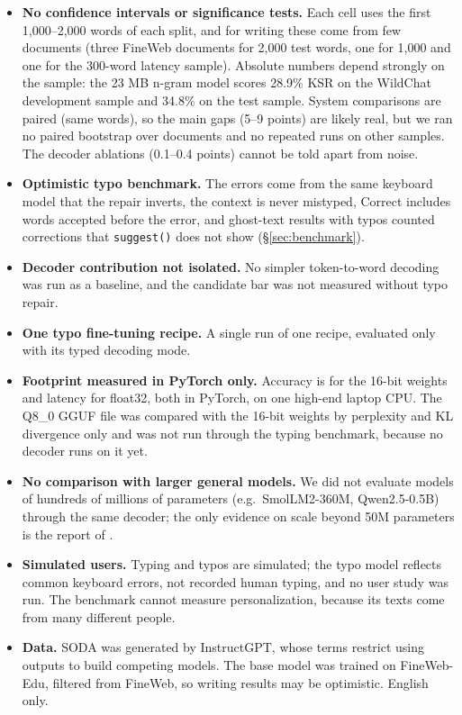 \documentclass[11pt]{article}
\begin{document}
\begin{itemize}
  \item \textbf{No confidence intervals or significance tests.} Each cell uses the first 1,000--2,000 words of each
  split, and for writing these come from few documents (three FineWeb documents for 2,000 test words, one for 1,000
  and one for the 300-word latency sample). Absolute numbers depend strongly on the sample: the 23 MB n-gram model
  scores 28.9\% KSR on the WildChat development sample and 34.8\% on the test sample. System comparisons are paired
  (same words), so the main gaps (5--9 points) are likely real, but we ran no paired bootstrap over documents and no
  repeated runs on other samples. The decoder ablations (0.1--0.4 points) cannot be told apart from noise.
  \item \textbf{Optimistic typo benchmark.} The errors come from the same keyboard model that the repair inverts, the
  context is never mistyped, Correct includes words accepted before the error, and ghost-text results with typos
  counted corrections that \texttt{suggest()} does not show (\S\ref{sec:benchmark}).
  \item \textbf{Decoder contribution not isolated.} No simpler token-to-word decoding was run as a baseline, and the
  candidate bar was not measured without typo repair.
  \item \textbf{One typo fine-tuning recipe.} A single run of one recipe, evaluated only with its typed decoding
  mode.
  \item \textbf{Footprint measured in PyTorch only.} Accuracy is for the 16-bit weights and latency for float32, both
  in PyTorch, on one high-end laptop CPU. The Q8\_0 GGUF file was compared with the 16-bit weights by perplexity and
  KL divergence only and was not run through the typing benchmark, because no decoder runs on it yet.
  \item \textbf{No comparison with larger general models.} We did not evaluate models of hundreds of millions of
  parameters (e.g.\ SmolLM2-360M, Qwen2.5-0.5B) through the same decoder; the only evidence on scale beyond 50M
  parameters is the report of \citet{lexo-2026}.
  \item \textbf{Simulated users.} Typing and typos are simulated; the typo model reflects common keyboard errors,
  not recorded human typing, and no user study was run. The benchmark cannot measure personalization, because its
  texts come from many different people.
  \item \textbf{Data.} SODA was generated by InstructGPT, whose terms restrict using outputs to build competing
  models. The base model was trained on FineWeb-Edu, filtered from FineWeb, so writing results may be optimistic.
  English only.
\end{itemize}
\end{document}
